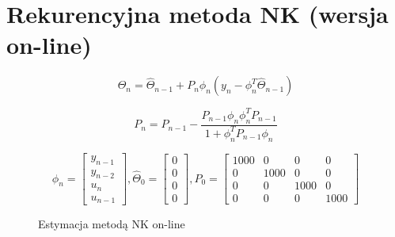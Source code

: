 \documentclass{article}
\begin{document}

\section{Rekurencyjna metoda NK (wersja on-line)}

\begin{equation}
\widehat{\Theta}_n = \widehat{\Theta}_{n-1} + P_n \phi_n ( y_n - \phi_n^T \widehat{\Theta}_{n-1} )
\end{equation}

\begin{equation}
P_n = P_{n-1} - \frac{P_{n-1} \phi_n \phi_n^T  P_{n-1}}{1 + \phi_n^T P_{n-1} \phi_n}
\end{equation}

\begin{equation}
\phi_n = \begin{bmatrix}
y_{n-1} \\ y_{n-2} \\ u_n \\ u_{n-1}
\end{bmatrix}
,
\widehat{\Theta}_0 =  \begin{bmatrix}
0 \\  0 \\ 0 \\ 0
\end{bmatrix}
,
P_0= \begin{bmatrix}
1000 & 0 & 0 & 0 \\ 
0 & 1000 & 0 & 0 \\ 
0 & 0 & 1000 & 0 \\ 
0 & 0 & 0 & 1000 
\end{bmatrix}
\end{equation}

\pagebreak

\begin{figure}[ht]
\centering
{}
\caption{Estymacja metodą NK on-line}
\end{figure}
\end{document}
